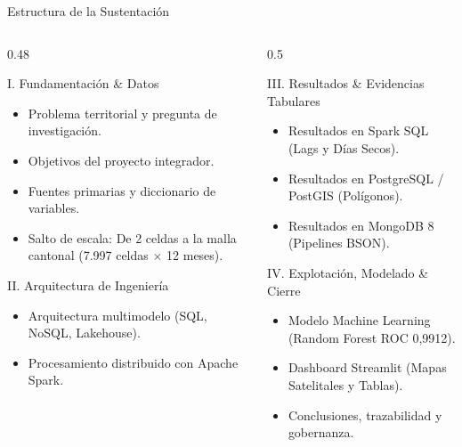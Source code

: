 \documentclass[aspectratio=169,11pt]{beamer}
\newcommand{\seccionactual}{Sustentaci\'on Final}
\begin{document}
\renewcommand{\seccionactual}{Contenido}
\begin{frame}{Estructura de la Sustentaci\'on}
  \begin{columns}[t]
    \begin{column}{0.48\textwidth}
      \begin{block}{I. Fundamentaci\'on \& Datos}
        \begin{itemize}\small
          \item Problema territorial y pregunta de investigaci\'on.
          \item Objetivos del proyecto integrador.
          \item Fuentes primarias y diccionario de variables.
          \item Salto de escala: De 2 celdas a la malla cantonal (7.997 celdas $\times$ 12 meses).
        \end{itemize}
      \end{block}
      \vspace{0.2cm}
      \begin{block}{II. Arquitectura de Ingenier\'ia}
        \begin{itemize}\small
          \item Arquitectura multimodelo (SQL, NoSQL, Lakehouse).
          \item Procesamiento distribuido con Apache Spark.
        \end{itemize}
      \end{block}
    \end{column}
    \begin{column}{0.5\textwidth}
      \begin{block}{III. Resultados \& Evidencias Tabulares}
        \begin{itemize}\small
          \item Resultados en Spark SQL (Lags y D\'ias Secos).
          \item Resultados en PostgreSQL / PostGIS (Pol\'igonos).
          \item Resultados en MongoDB 8 (Pipelines BSON).
        \end{itemize}
      \end{block}
      \vspace{0.4cm}
      \begin{block}{IV. Explotaci\'on, Modelado \& Cierre}
        \begin{itemize}\small
          \item Modelo Machine Learning (Random Forest ROC 0,9912).
          \item Dashboard Streamlit (Mapas Satelitales y Tablas).
          \item Conclusiones, trazabilidad y gobernanza.
        \end{itemize}
      \end{block}
    \end{column}
  \end{columns}
\end{frame}
\end{document}
